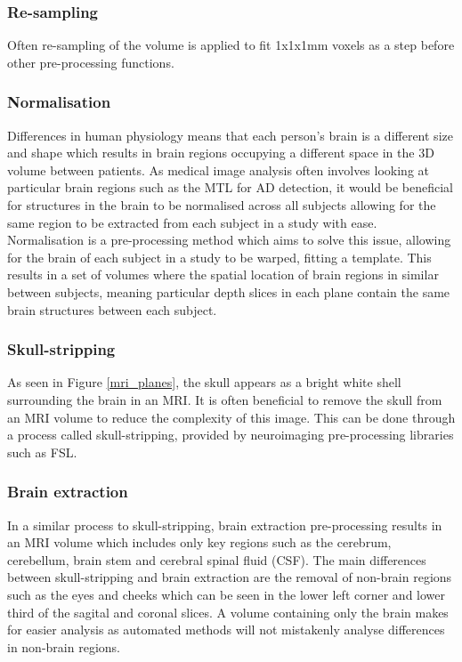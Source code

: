 \documentclass[
    author={Kai Hulme},
    supervisor={Dr Jon Bird},
    degree={BSc},
    title={Generative Adversarial Networks as an Augmentation Technique},
    subtitle={for Alzheimer's Disease Detection in MRI Volumes},
    type={Research},
    year={2021} 
]{dissertation}
\begin{document}
\subsubsection{Re-sampling}

Often re-sampling of the volume is applied to fit 1x1x1mm voxels as a step before other pre-processing functions. 

\subsubsection{Normalisation}

Differences in human physiology means that each person's brain is a different size and shape which results in brain regions occupying a different space in the 3D volume between patients. As medical image analysis often involves looking at particular brain regions such as the MTL for AD detection, it would be beneficial for structures in the brain to be normalised across all subjects allowing for the same region to be extracted from each subject in a study with ease. \\

Normalisation is a pre-processing method which aims to solve this issue, allowing for the brain of each subject in a study to be warped, fitting a template. This results in a set of volumes where the spatial location of brain regions in similar between subjects, meaning particular depth slices in each plane contain the same brain structures between each subject.

\subsubsection{Skull-stripping}

As seen in Figure \ref{mri_planes}, the skull appears as a bright white shell surrounding the brain in an MRI. It is often beneficial to remove the skull from an MRI volume to reduce the complexity of this image. This can be done through a process called skull-stripping, provided by neuroimaging pre-processing libraries such as FSL.

\subsubsection{Brain extraction}

In a similar process to skull-stripping, brain extraction pre-processing results in an MRI volume which includes only key regions such as the cerebrum, cerebellum, brain stem and cerebral spinal fluid (CSF). The main differences between skull-stripping and brain extraction are the removal of non-brain regions such as the eyes and cheeks which can be seen in the lower left corner and lower third of the sagital and coronal slices. A volume containing only the brain makes for easier analysis as automated methods will not mistakenly analyse differences in non-brain regions.
\end{document}
